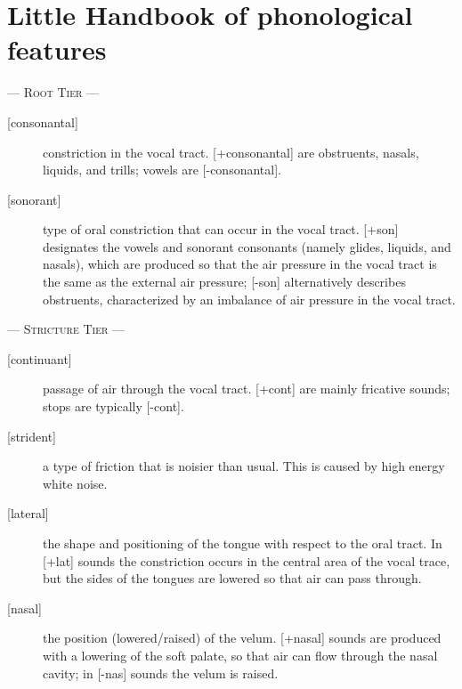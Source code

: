 \documentclass[11pt, oneside]{article}   	%
\begin{document}
\newpage

\thispagestyle{empty}

\appendix

\section{Little Handbook of phonological features}

\begin{tcolorbox}
\small
\begin{center} --- {\scshape Root Tier} --- \end{center}
\vspace{-2em}
\begin{description}
	\item[{[consonantal]}] constriction in the vocal tract. [+consonantal] are obstruents, nasals, liquids, and trills; vowels are [-consonantal].
	\item[{[}sonorant{]}] type of oral constriction that can occur in the vocal tract. [+son] designates the vowels and sonorant consonants (namely glides, liquids, and nasals), which are produced so that the air pressure in the vocal tract is the same as the external air pressure; [-son] alternatively describes obstruents, characterized by an imbalance of air pressure in the vocal tract.
\end{description}
\vspace{-2em}

\begin{center} --- {\scshape Stricture Tier} --- \end{center}
\vspace{-2em}
\begin{description}
	\item[{[continuant]}] passage  of  air  through  the  vocal  tract.  [+cont]  are  mainly  fricative  sounds;   stops  are typically [-cont].
	\item[{[strident]}] a type of friction that is noisier than usual. This is caused by high energy white noise.
	\item[{[lateral]}]	the shape and positioning of the tongue with respect to the oral tract. In [+lat]  sounds the constriction occurs in the central area of the vocal trace, but the sides of the tongues are lowered so that air can pass through.
	\item[{[nasal]}]	the position (lowered/raised) of the velum. [+nasal] sounds are produced with a lowering of the soft palate, so that air can flow through the nasal cavity; in [-nas] sounds the velum is raised.
\end{description}
\vspace{-2em}


\end{tcolorbox}
\end{document}
